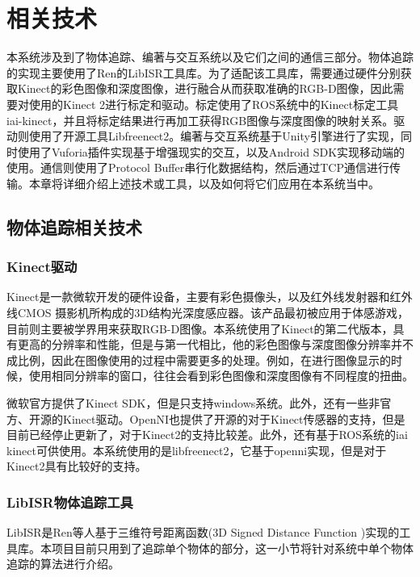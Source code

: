 \chapter{相关技术}
\label{chap:tech}

本系统涉及到了物体追踪、编著与交互系统以及它们之间的通信三部分。物体追踪的实现主要使用了Ren的LibISR工具库\cite{Ren_3DV_2014,star3d_iccv_2013}。为了适配该工具库，需要通过硬件分别获取Kinect的彩色图像和深度图像，进行融合从而获取准确的RGB-D图像，因此需要对使用的Kinect 2进行标定和驱动。标定使用了ROS系统中的Kinect标定工具iai-kinect\cite{iai_kinect2}，并且将标定结果进行再加工获得RGB图像与深度图像的映射关系。驱动则使用了开源工具Libfreenect2\cite{libfreenect2}。编著与交互系统基于Unity引擎\cite{Unity}进行了实现，同时使用了Vuforia插件\cite{Vuforia}实现基于增强现实的交互，以及Android SDK\cite{Android}实现移动端的使用。通信则使用了Protocol Buffer\cite{Protobuf, ProtobufNet}串行化数据结构，然后通过TCP通信进行传输。本章将详细介绍上述技术或工具，以及如何将它们应用在本系统当中。

\section{物体追踪相关技术}
\subsection{Kinect驱动}
Kinect是一款微软开发的硬件设备，主要有彩色摄像头，以及红外线发射器和红外线CMOS 摄影机所构成的3D结构光深度感应器。该产品最初被应用于体感游戏，目前则主要被学界用来获取RGB-D图像。本系统使用了Kinect的第二代版本，具有更高的分辨率和性能，但是与第一代相比，他的彩色图像与深度图像分辨率并不成比例，因此在图像使用的过程中需要更多的处理。例如，在进行图像显示的时候，使用相同分辨率的窗口，往往会看到彩色图像和深度图像有不同程度的扭曲。

微软官方提供了Kinect SDK，但是只支持windows系统。此外，还有一些非官方、开源的Kinect驱动。OpenNI\cite{Openni}也提供了开源的对于Kinect传感器的支持，但是目前已经停止更新了，对于Kinect2的支持比较差。此外，还有基于ROS系统的iai kinect\cite{iai_kinect2}可供使用。本系统使用的是libfreenect2\cite{libfreenect2}，它基于openni实现，但是对于Kinect2具有比较好的支持。

\subsection{LibISR物体追踪工具}
LibISR是Ren等人基于三维符号距离函数(3D Signed Distance Function )实现的工具库\cite{Ren_3DV_2014, star3d_iccv_2013}。本项目目前只用到了追踪单个物体的部分，这一小节将针对系统中单个物体追踪的算法进行介绍\cite{ren2017real}。

